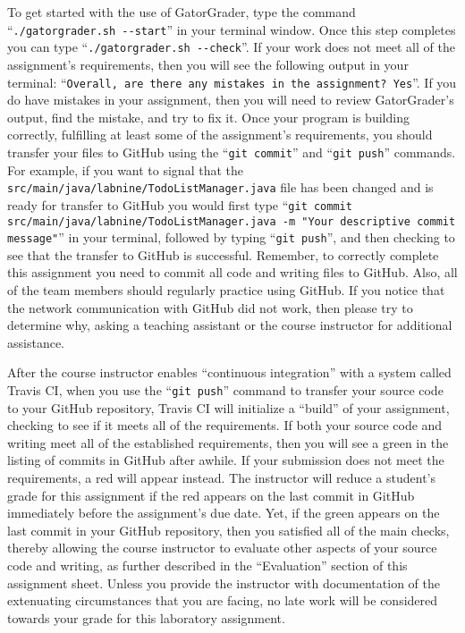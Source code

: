 \documentclass[11pt]{article}
\newcommand{\mainprogramsource}{\lstinline{src/main/java/labnine/TodoListManager.java}}
\newcommand{\gatorgraderstart}{\command{./gatorgrader.sh --start}}
\newcommand{\gatorgradercheck}{\command{./gatorgrader.sh --check}}
\newcommand{\gitcommit}{\command{git commit}}
\newcommand{\gitpush}{\command{git push}}
\newcommand{\gitcommitmainprogram}{\command{git commit src/main/java/labnine/TodoListManager.java -m "Your
descriptive commit message"}}
\newcommand{\command}[1]{``\lstinline{#1}''}
\newcommand{\step}[1]{``{#1}''}
\newcommand{\checkmark}{\ding{51}}
\newcommand{\naughtmark}{\ding{55}}
\begin{document}
To get started with the use of GatorGrader, type the command \gatorgraderstart{} in your terminal window. Once this step
completes you can type \gatorgradercheck{}. If your work does not meet all of the assignment's requirements, then you
will see the following output in your terminal: \command{Overall, are there any mistakes in the assignment? Yes}. If you
do have mistakes in your assignment, then you will need to review GatorGrader's output, find the mistake, and try to fix
it. Once your program is building correctly, fulfilling at least some of the assignment's requirements, you should
transfer your files to GitHub using the \gitcommit{} and \gitpush{} commands. For example, if you want to signal that
the \mainprogramsource{} file has been changed and is ready for transfer to GitHub you would first type
\gitcommitmainprogram{} in your terminal, followed by typing \gitpush{}, and then checking to see that the transfer to
GitHub is successful. Remember, to correctly complete this assignment you need to commit all code and writing files to
GitHub. Also, all of the team members should regularly practice using GitHub. If you notice that the network
communication with GitHub did not work, then please try to determine why, asking a teaching assistant or the course
instructor for additional assistance.

After the course instructor enables \step{continuous integration} with a system called Travis CI, when you use the
\gitpush{} command to transfer your source code to your GitHub repository, Travis CI will initialize a \step{build} of
your assignment, checking to see if it meets all of the requirements. If both your source code and writing meet all of
the established requirements, then you will see a green \checkmark{} in the listing of commits in GitHub after awhile.
If your submission does not meet the requirements, a red \naughtmark{} will appear instead. The instructor will reduce a
student's grade for this assignment if the red \naughtmark{} appears on the last commit in GitHub immediately before the
assignment's due date. Yet, if the green \checkmark{} appears on the last commit in your GitHub repository, then you
satisfied all of the main checks, thereby allowing the course instructor to evaluate other aspects of your source code
and writing, as further described in the \step{Evaluation} section of this assignment sheet. Unless you provide the
instructor with documentation of the extenuating circumstances that you are facing, no late work will be considered
towards your grade for this laboratory assignment.
\end{document}
